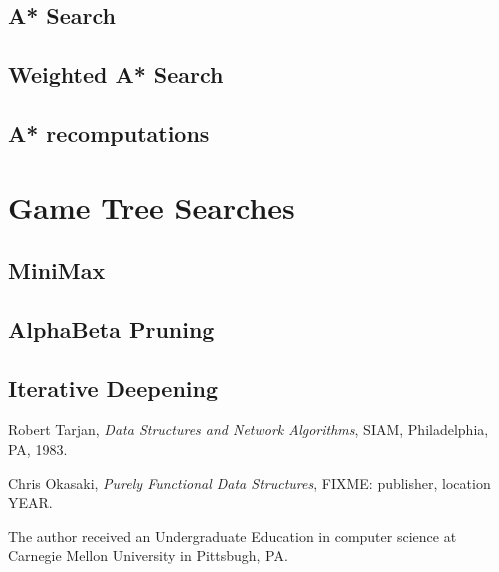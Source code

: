 \documentclass[12pt, letterpaper]{book}
\begin{document}
		\section{A* Search}
		\section{Weighted A* Search}
		\section{A* recomputations}

	\chapter{Game Tree Searches} \label{game trees}
		\section{MiniMax} \label{minimax}
		\section{AlphaBeta Pruning}
		\section{Iterative Deepening}

\begin{thebibliography}{9}

  Robert Tarjan,
  \emph{Data Structures and Network Algorithms},
  SIAM, Philadelphia, PA,
  1983.

  Chris Okasaki,
  \emph{Purely Functional Data Structures},
  FIXME: publisher, location
  YEAR.

	The author received an Undergraduate Education in computer science at Carnegie Mellon University in Pittsbugh, PA.

\end{thebibliography}
\end{document}
